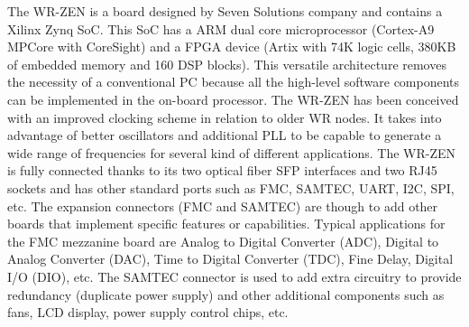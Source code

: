 \documentclass[review]{elsarticle}
\begin{document}
%
%

The WR-ZEN is a board designed by Seven Solutions company and contains a Xilinx Zynq SoC. This SoC has a ARM dual core microprocessor (Cortex-A9 MPCore with CoreSight) and a FPGA device (Artix with 74K logic cells, 380KB of embedded memory and 160 DSP blocks). This versatile architecture removes the necessity of a conventional PC because all the high-level software components can be implemented in the on-board processor. The WR-ZEN has been conceived with an improved clocking scheme in relation to older WR nodes.  It takes into advantage of better oscillators and additional PLL to be capable to generate a wide range of frequencies for several kind of different applications. The WR-ZEN is fully connected thanks to its two optical fiber SFP interfaces and two RJ45 sockets and has other standard ports such as FMC, SAMTEC, UART, I2C, SPI, etc. The expansion connectors (FMC and SAMTEC) are though to add other boards that implement specific features or capabilities. Typical applications for the FMC mezzanine board are Analog to Digital Converter (ADC), Digital to Analog Converter (DAC), Time to Digital Converter (TDC), Fine Delay, Digital I/O (DIO), etc. The SAMTEC connector is used to add extra circuitry to provide redundancy (duplicate power supply) and other additional components such as fans, LCD display, power supply control chips, etc.
\end{document}
